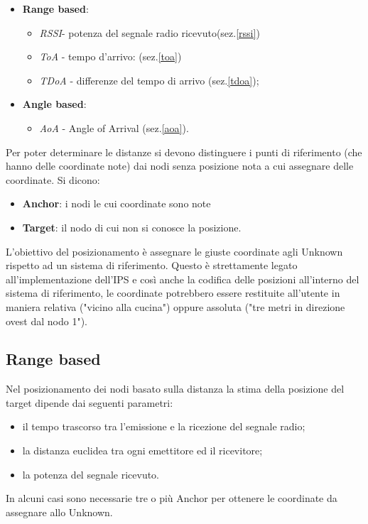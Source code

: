 	\begin{itemize}
	\item \textbf{Range based}:
	
		\begin{itemize}
		\item \textit{RSSI}- potenza del segnale radio ricevuto(sez.\ref{rssi})
		\item \textit{ToA} - tempo d’arrivo: (sez.\ref{toa})
		\item \textit{TDoA} - differenze del tempo di arrivo (sez.\ref{tdoa});
 	    \end{itemize}
     
	\item \textbf{Angle based}:
		\begin{itemize}
			\item \textit{AoA} - Angle of Arrival (sez.\ref{aoa}).
		\end{itemize}
		
\end{itemize}
Per poter determinare le distanze si devono distinguere i punti di riferimento (che hanno
delle coordinate note) dai nodi senza posizione nota a cui assegnare delle coordinate.
Si dicono:
\begin{itemize}
	\item \textbf{Anchor}: i nodi le cui coordinate sono note
	\item \textbf{Target}: il nodo di cui non si conosce la posizione.
\end{itemize}

 L’obiettivo del posizionamento è assegnare le giuste coordinate agli Unknown rispetto ad un sistema di riferimento. Questo è strettamente legato all'implementazione dell'IPS e così anche la codifica delle posizioni all'interno del sistema di riferimento, le coordinate potrebbero essere restituite all'utente in maniera relativa ("vicino alla cucina") oppure assoluta ("tre  metri in direzione ovest dal nodo 1").

\subsection{Range based}
Nel posizionamento dei nodi basato sulla distanza la stima della posizione del target dipende dai seguenti parametri:
	\begin{itemize}
	\item il tempo trascorso tra l’emissione e la ricezione del segnale radio;
	\item la distanza euclidea tra ogni emettitore ed il ricevitore;
	\item la potenza del segnale ricevuto.
\end{itemize}
In alcuni casi sono necessarie tre o più Anchor per ottenere le coordinate da assegnare allo Unknown.

